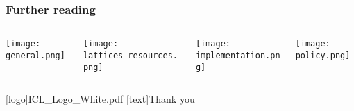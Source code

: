 \documentclass[
aspectratio=169, %
t, %
onlytextwidth, %
10pt, %
]{beamer}
\begin{document}
\begin{frame}
    \frametitle{Further reading}
    \begin{adjustwidth}{0cm}{0.15\textwidth} %
        \begin{columns}[T] %
            \begin{column}{0.3\linewidth} %
                \texttt{[image: general.png]}
            \end{column}
            \begin{column}{0.3\linewidth} %
                \texttt{[image: lattices\_resources.png]}
            \end{column}
            \begin{column}{0.3\linewidth} %

                \texttt{[image: implementation.png]}
            \end{column}
            \begin{column}{0.3\linewidth} %
                \texttt{[image: policy.png]}
            \end{column}
        \end{columns}
    \end{adjustwidth}
\end{frame}


\begingroup
	[logo]{ICL_Logo_White.pdf} %
	[text]{Thank you} %
	
\endgroup

\end{document}
